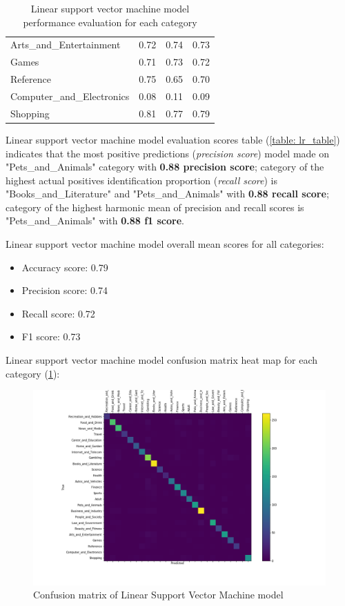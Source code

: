 \begin{enumerate}
\begin{table}[H]
\begin{tabular}{l|c|c|c|}
            Arts\_and\_Entertainment & 0.72 & 0.74 & 0.73 \\ \cline{2-4} 
            Games & 0.71 & 0.73 & 0.72  \\ \cline{2-4} 
            Reference &  0.75 & 0.65 & 0.70 \\ \cline{2-4} 
            Computer\_and\_Electronics &  0.08 & 0.11 & 0.09 \\ \cline{2-4} 
            Shopping &   0.81 & 0.77 & 0.79 \\ \cline{2-4} 
        \end{tabular}
        \caption{Linear support vector machine model performance evaluation for each category}
        \label{table: svm_table}
    \end{table}


     Linear support vector machine model evaluation scores table (\ref{table: lr_table}) indicates that the most positive predictions (\textit{precision score}) model made on "Pets\_and\_Animals" category with \textbf{0.88 precision score}; category of the highest actual positives identification proportion (\textit{recall score}) is "Books\_and\_Literature" and "Pets\_and\_Animals" with  \textbf{0.88 recall score}; category of the highest harmonic mean of precision and recall scores is "Pets\_and\_Animals" with  \textbf{0.88 f1 score}.
    
    Linear support vector machine model overall mean scores for all categories:
    \label{sssec:lsvm_overall}
    \begin{itemize}
        \item Accuracy score: 0.79
        \item Precision score: 0.74
        \item Recall score: 0.72
        \item F1 score: 0.73
    \end{itemize}
    
    
    Linear support vector machine model confusion matrix heat map for each category (\ref{fig:lsvm_confusion_matrix}):
    \begin{figure}[H]
        \centering
        \includegraphics[width=1.2\textwidth]{Pictures/lsvm_confusion_matrix.png}
        \caption{\label{fig:lsvm_confusion_matrix}{} Confusion matrix of Linear Support Vector Machine model}
    \end{figure}
    

\end{enumerate}
